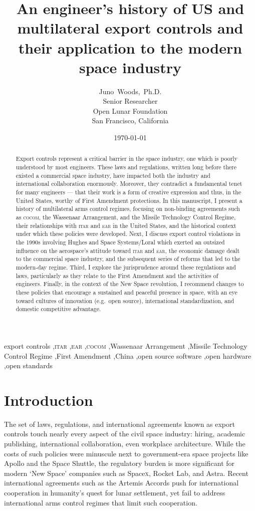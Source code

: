 \documentclass[12pt]{olfmemo}
\title{An engineer's history of US and multilateral export controls and their application to the modern space industry}
\author{
        Juno~Woods,~Ph.D. \\
        Senior Researcher\\
        Open Lunar Foundation\\
        San Francisco, California
}
\date{\today}
\begin{document}
\begin{abstract}
Export controls represent a critical barrier in the space industry, one which is poorly understood by most engineers. These laws and regulations, written long before there existed a commercial space industry, have impacted both the industry and international collaboration enormously. Moreover, they contradict a fundamental tenet for many engineers --- that their work is a form of creative expression and thus, in the United States, worthy of First Amendment protections. In this manuscript, I present a history of multilateral arms control regimes, focusing on non-binding agreements such as \textsc{cocom}, the Wassenaar Arrangement, and the Missile Technology Control Regime, their relationships with \textsc{itar} and \textsc{ear} in the United States, and the historical context under which these policies were developed. Next, I discuss export control violations in the 1990s involving Hughes and Space Systems/Loral which exerted an outsized influence on the aerospace's attitude toward \textsc{itar} and \textsc{ear}, the economic damage dealt to the commercial space industry, and the subsequent series of reforms that led to the modern-day regime. Third, I explore the jurisprudence around these regulations and laws, particularly as they relate to the First Amendment and the activities of engineers. Finally, in the context of the New Space revolution, I recommend changes to these policies that encourage a sustained and peaceful presence in space, with an eye toward cultures of innovation (e.g.\ open source), international standardization, and domestic competitive advantage.
\end{abstract}

\begin{keyword}
export controls \sep \textsc{itar} \sep \textsc{ear} \sep \textsc{cocom} \sep Wassenaar Arrangement \sep Missile Technology Control Regime \sep First Amendment \sep China \sep open source software \sep open hardware \sep open standards
\end{keyword}

\maketitle

\section{Introduction}
The set of laws, regulations, and international agreements known as export controls touch nearly every aspect of the civil space industry: hiring, academic publishing, international collaboration, even workplace architecture. While the costs of such policies were minuscule next to government-era space projects like Apollo and the Space Shuttle, the regulatory burden is more significant for modern `New Space' companies such as Space\textsc{x}, Rocket Lab, and Astra. Recent international agreements such as the Artemis Accords push for international cooperation in humanity's quest for lunar settlement, yet fail to address international arms control regimes that limit such cooperation.
\end{document}
